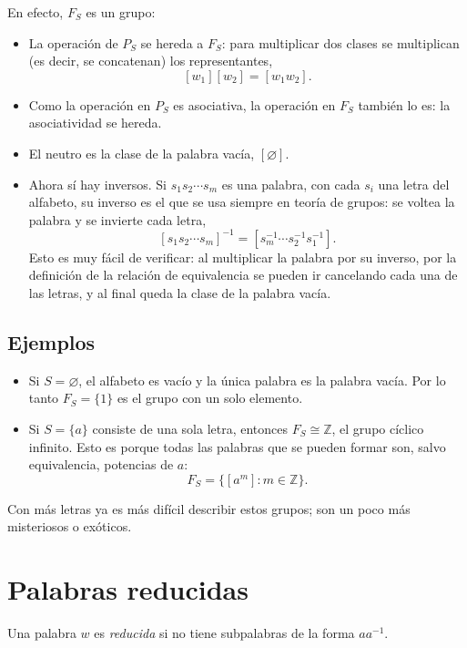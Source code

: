 \documentclass[11pt]{article}
\begin{document}
En efecto, $F_S$ es un grupo:
\begin{itemize}
  \item La operación de $P_S$ se hereda a $F_S$: para multiplicar dos clases se multiplican (es decir, se concatenan) los representantes,
  \[
    [w_1][w_2]=[w_1w_2].
  \]
  \item Como la operación en $P_S$ es asociativa, la operación en $F_S$ también lo es: la asociatividad se hereda.
  \item El neutro es la clase de la palabra vacía, $[\varnothing]$.
  \item Ahora sí hay inversos. Si $s_1s_2\cdots s_m$ es una palabra, con cada $s_i$ una letra del alfabeto, su inverso es el que se usa siempre en teoría de grupos: se voltea la palabra y se invierte cada letra,
  \[
    [s_1s_2\cdots s_m]^{-1}=[s_m^{-1}\cdots s_2^{-1}s_1^{-1}].
  \]
  Esto es muy fácil de verificar: al multiplicar la palabra por su inverso, por la definición de la relación de equivalencia se pueden ir cancelando cada una de las letras, y al final queda la clase de la palabra vacía.
\end{itemize}

\subsection*{Ejemplos}

\begin{itemize}
  \item Si $S=\varnothing$, el alfabeto es vacío y la única palabra es la palabra vacía. Por lo tanto $F_S=\{1\}$ es el grupo con un solo elemento.
  \item Si $S=\{a\}$ consiste de una sola letra, entonces $F_S\cong\mathbb{Z}$, el grupo cíclico infinito. Esto es porque todas las palabras que se pueden formar son, salvo equivalencia, potencias de $a$:
  \[
    F_S=\{[a^m] : m\in\mathbb{Z}\}.
  \]
\end{itemize}
Con más letras ya es más difícil describir estos grupos; son un poco más misteriosos o exóticos.

\section*{Palabras reducidas}

\begin{defn}\label{defn:reducida}
Una palabra $w$ es \emph{reducida} si no tiene subpalabras de la forma $aa^{-1}$.
\end{defn}
\end{document}
